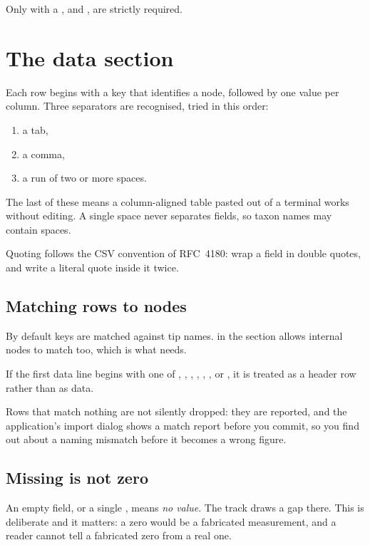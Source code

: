 Only \cmd{[track]} with a , and \cmd{[data]}, are strictly required.

\section{The data section}

Each row begins with a key that identifies a node, followed by one value per
column. Three separators are recognised, tried in this order:

\begin{enumerate}
  \item a tab,
  \item a comma,
  \item a run of two or more spaces.
\end{enumerate}

The last of these means a column-aligned table pasted out of a terminal works
without editing. A single space never separates fields, so taxon names may
contain spaces.

Quoting follows the CSV convention of RFC~4180: wrap a field in double quotes,
and write a literal quote inside it twice.

\subsection{Matching rows to nodes}

By default keys are matched against tip names.  in the
\cmd{[track]} section allows internal nodes to match too, which is what
 needs.

If the first data line begins with one of , , ,
, , ,  or , it is treated as a
header row rather than as data.

Rows that match nothing are not silently dropped: they are reported, and the
application's import dialog shows a match report before you commit, so you find
out about a naming mismatch before it becomes a wrong figure.

\subsection{Missing is not zero}

An empty field, or a single \cmd{-}, means \emph{no value}. The track draws a gap
there. This is deliberate and it matters: a zero would be a fabricated
measurement, and a reader cannot tell a fabricated zero from a real one.

